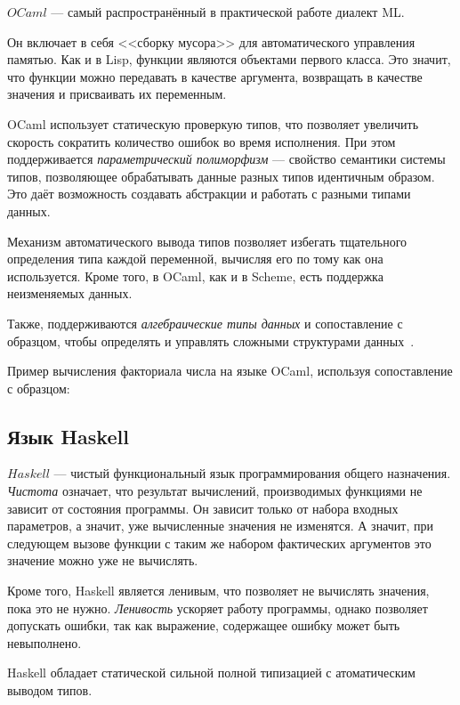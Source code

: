         $OCaml$ --- самый распространённый в практической работе диалект ML.

        Он включает в себя <<сборку мусора>> для автоматического управления памятью.
        Как и в Lisp, функции являются объектами первого класса.
        Это значит, что функции можно передавать в качестве аргумента, возвращать в качестве значения и присваивать их переменным.

        OCaml использует статическую проверкую типов, что позволяет увеличить скорость сократить количество ошибок во время исполнения.
        При этом поддерживается \textit{параметрический полиморфизм} --- свойство семантики системы типов, позволяющее обрабатывать данные разных типов идентичным образом.
        Это даёт возможность создавать абстракции и работать с разными типами данных.

        Механизм автоматического вывода типов позволяет избегать тщательного определения типа каждой переменной, вычисляя его по тому как она используется.
        Кроме того, в OCaml, как и в Scheme, есть поддержка неизменяемых данных.

        Также, поддерживаются \textit{алгебраические типы данных} и сопоставление с образцом, чтобы определять и управлять сложными структурами данных~\cite{ocaml}.

        Пример вычисления факториала числа на языке OCaml, используя сопоставление с образцом:

        

    \subsection{Язык Haskell}
        $Haskell$ --- чистый функциональный язык программирования общего назначения.
        \textit{Чистота} означает, что результат вычислений, производимых функциями не зависит от состояния программы.
        Он зависит только от набора входных параметров, а значит, уже вычисленные значения не изменятся.
        А значит, при следующем вызове функции с таким же набором фактических аргументов это значение можно уже не вычислять.

        Кроме того, Haskell является ленивым, что позволяет не вычислять значения, пока это не нужно.
        \textit{Ленивость} ускоряет работу программы, однако позволяет допускать ошибки, так как выражение, содержащее ошибку может быть невыполнено.

        Haskell обладает статической сильной полной типизацией с атоматическим выводом типов.
        
